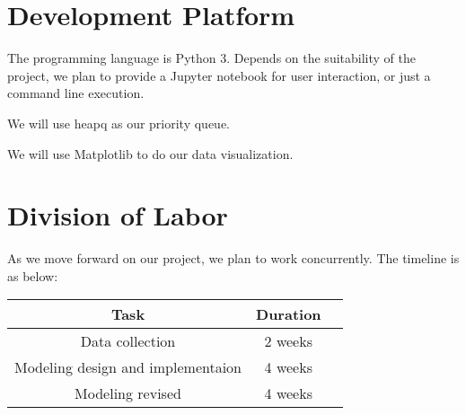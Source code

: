 \documentclass{article}
\begin{document}
\begin{normalsize}
    \section{Development Platform}
    The programming language is Python $3$. Depends on the suitability of the project, we plan to provide a Jupyter notebook for user interaction, or just a command line execution.
    
    We will use heapq as our priority queue.
    
    We will use Matplotlib to do our data visualization.
    
    \section{Division of Labor}
    As we move forward on our project, we plan to work concurrently. The timeline is as below:
       
    \begin{center}
    	\begin{tabular}{ |c|c|c| } 
    		\hline
    		Task & Duration  \\ 
    		\hline
    		Data collection & 2 weeks \\ 
    		Modeling design and implementaion & 4 weeks \\ 
    		Modeling revised & 4 weeks \\ 
    		\hline
    	\end{tabular}
    \end{center}
    
    
    
    
    
\end{normalsize}
  
\end{document}
